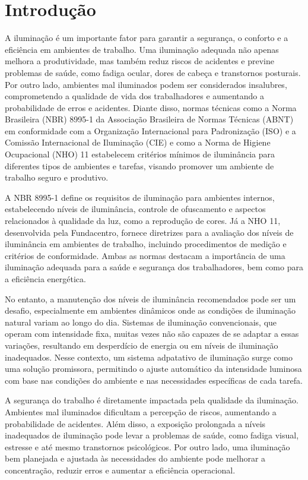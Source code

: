 % 
% 
\chapter{Introdução}


A iluminação é um importante fator para garantir a segurança, o conforto e a eficiência em ambientes de trabalho. Uma iluminação adequada não apenas melhora a produtividade, mas também reduz riscos de acidentes e previne problemas de saúde, como fadiga ocular, dores de cabeça e transtornos posturais. Por outro lado, ambientes mal iluminados podem ser considerados insalubres, comprometendo a qualidade de vida dos trabalhadores e aumentando a probabilidade de erros e acidentes. Diante disso, normas técnicas como a Norma Brasileira (\gls{NBR}) 8995-1 da Associação Brasileira de Normas Técnicas (\gls{ABNT}) em conformidade com a Organização Internacional para Padronização (\gls{ISO}) e a Comissão Internacional de Iluminação (\gls{CIE}) e como a Norma de Higiene Ocupacional (\gls{NHO}) 11 estabelecem critérios mínimos de iluminância para diferentes tipos de ambientes e tarefas, visando promover um ambiente de trabalho seguro e produtivo.

A \gls{NBR} 8995-1 define os requisitos de iluminação para ambientes internos, estabelecendo níveis de iluminância, controle de ofuscamento e aspectos relacionados à qualidade da luz, como a reprodução de cores. Já a \gls{NHO} 11, desenvolvida pela Fundacentro, fornece diretrizes para a avaliação dos níveis de iluminância em ambientes de trabalho, incluindo procedimentos de medição e critérios de conformidade. Ambas as normas destacam a importância de uma iluminação adequada para a saúde e segurança dos trabalhadores, bem como para a eficiência energética.

No entanto, a manutenção dos níveis de iluminância recomendados pode ser um desafio, especialmente em ambientes dinâmicos onde as condições de iluminação natural variam ao longo do dia. Sistemas de iluminação convencionais, que operam com intensidade fixa, muitas vezes não são capazes de se adaptar a essas variações, resultando em desperdício de energia ou em níveis de iluminação inadequados. Nesse contexto, um sistema adpatativo de iluminação surge como uma solução promissora, permitindo o ajuste automático da intensidade luminosa com base nas condições do ambiente e nas necessidades específicas de cada tarefa.

A segurança do trabalho é diretamente impactada pela qualidade da iluminação. Ambientes mal iluminados dificultam a percepção de riscos, aumentando a probabilidade de acidentes. Além disso, a exposição prolongada a níveis inadequados de iluminação pode levar a problemas de saúde, como fadiga visual, estresse e até mesmo transtornos psicológicos. Por outro lado, uma iluminação bem planejada e ajustada às necessidades do ambiente pode melhorar a concentração, reduzir erros e aumentar a eficiência operacional.

